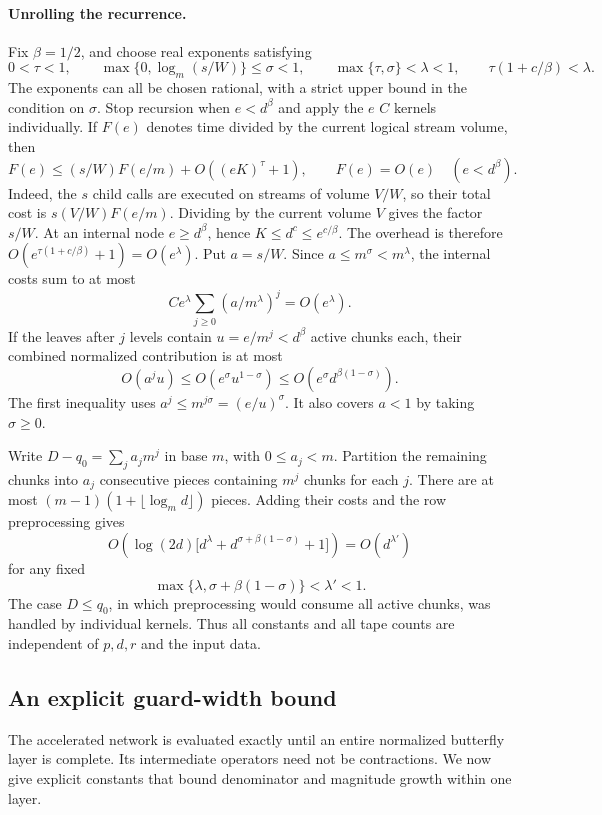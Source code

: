 \paragraph{Unrolling the recurrence.}
Fix \(\beta=1/2\), and choose real exponents satisfying
\[
 0<\tau<1,\qquad
 \max\{0,\log_m(s/W)\}\le\sigma<1,
 \qquad \max\{\tau,\sigma\}<\lambda<1,
 \qquad \tau(1+c/\beta)<\lambda.
\]
The exponents can all be chosen rational, with a strict upper bound
in the condition on \(\sigma\).  Stop recursion when
\(e<d^\beta\) and apply the \(e\) \(C\) kernels individually.  If
\(F(e)\) denotes time divided by the current logical stream volume,
then
\[
 F(e)\le (s/W)F(e/m)+O((eK)^\tau+1),
 \qquad F(e)=O(e)\quad(e<d^\beta).
\]
Indeed, the \(s\) child calls are executed on streams of volume
\(V/W\), so their total cost is \(s(V/W)F(e/m)\).  Dividing by
the current volume \(V\) gives the factor \(s/W\).
At an internal node \(e\ge d^\beta\), hence
\(K\le d^c\le e^{c/\beta}\).  The overhead is therefore
\(O(e^{\tau(1+c/\beta)}+1)=O(e^\lambda)\).
Put \(a=s/W\).  Since \(a\le m^\sigma<m^\lambda\), the internal
costs sum to at most
\[
 C e^\lambda\sum_{j\ge0}(a/m^\lambda)^j=O(e^\lambda).
\]
If the leaves after \(j\) levels contain \(u=e/m^j<d^\beta\)
active chunks each, their combined normalized
contribution is at most
\[
 O(a^ju)\le O(e^\sigma u^{1-\sigma})
          \le O(e^\sigma d^{\beta(1-\sigma)}).
\]
The first inequality uses
\(a^j\le m^{j\sigma}=(e/u)^\sigma\).  It also covers \(a<1\)
by taking \(\sigma\ge0\).

Write \(D-q_0=\sum_j a_jm^j\) in base \(m\), with \(0\le a_j<m\).
Partition the remaining chunks into \(a_j\) consecutive pieces
containing \(m^j\) chunks for each \(j\).
There are at most \((m-1)(1+\lfloor\log_m d\rfloor)\) pieces.
Adding their costs and the row preprocessing gives
\[
 O\!\left(\log(2d)
    \bigl[d^\lambda+d^{\sigma+\beta(1-\sigma)}+1\bigr]\right)
   =O(d^{\lambda'})
\]
for any fixed
\[
 \max\{\lambda,\sigma+\beta(1-\sigma)\}<\lambda'<1.
\]
The case \(D\le q_0\), in which preprocessing would consume all
active chunks, was handled by individual kernels.  Thus all constants
and all tape counts are independent of \(p,d,r\) and the input data.

\subsection{An explicit guard-width bound}

The accelerated network is evaluated exactly until an entire
normalized butterfly layer is complete.  Its intermediate operators
need not be contractions.  We now give explicit constants that bound
denominator and magnitude growth within one layer.

